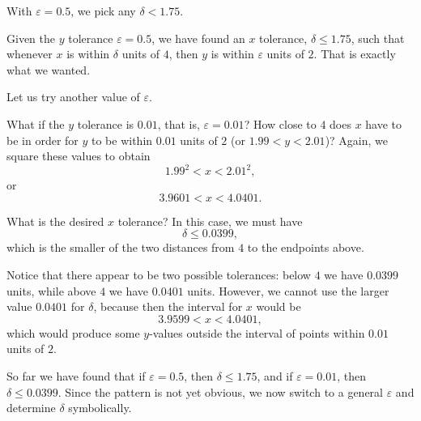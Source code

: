 \begin{example}
\begin{center}

\vspace{0.4em}
{\large With $\varepsilon=0.5$, we pick any $\delta<1.75$.}
\end{center}

\bigskip

Given the $y$ tolerance $\varepsilon=0.5$, we have found an $x$ tolerance,
$\delta\le 1.75$, such that whenever $x$ is within $\delta$ units of $4$, then
$y$ is within $\varepsilon$ units of $2$. That is exactly what we wanted.

\medskip

Let us try another value of $\varepsilon$.

\medskip

What if the $y$ tolerance is $0.01$, that is, $\varepsilon=0.01$?
How close to $4$ does $x$ have to be in order for $y$ to be within $0.01$ units
of $2$ (or $1.99<y<2.01$)?
Again, we square these values to obtain
\[
1.99^2<x<2.01^2,
\]
or
\[
3.9601<x<4.0401.
\]

What is the desired $x$ tolerance?
In this case, we must have
\[
\delta\le 0.0399,
\]
which is the smaller of the two distances from $4$ to the endpoints above.

Notice that there appear to be two possible tolerances: below $4$ we have
$0.0399$ units, while above $4$ we have $0.0401$ units.
However, we cannot use the larger value $0.0401$ for $\delta$, because then the
interval for $x$ would be
\[
3.9599<x<4.0401,
\]
which would produce some $y$-values outside the interval of points within
$0.01$ units of $2$.

\medskip

So far we have found that if $\varepsilon=0.5$, then $\delta\le 1.75$, and if
$\varepsilon=0.01$, then $\delta\le 0.0399$.
Since the pattern is not yet obvious, we now switch to a general $\varepsilon$
and determine $\delta$ symbolically.


\end{example}
